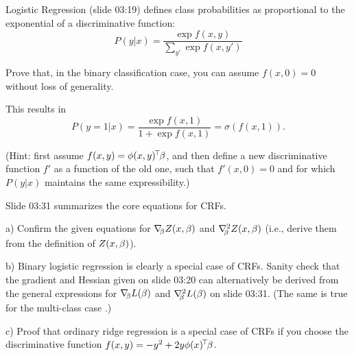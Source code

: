 



Logistic Regression (slide 03:19) defines class probabilities as proportional to
the exponential of a discriminative function:
$$P(y|x) = \frac{\exp f(x, y)}{\sum_{y'}\exp f(x, y')}$$

Prove that, in the binary classification case, you can assume $f(x, 0) = 0$
without loss of generality.  

This results in $$P(y=1|x) = \frac{\exp f(x, 1)}{1 + \exp f(x, 1)} =
\sigma(f(x, 1)).$$

(Hint: first assume $f(x, y) = \phi(x, y)^\T\beta$, and then define a new
discriminative function $f'$ as a function of the old one, such that $f'(x,
0)=0$ and for which $P(y|x)$ maintains the same expressibility.)



Slide 03:31 summarizes the core equations for CRFs.

a) Confirm the given equations for $\na_\b Z(x,\b)$ and $\he[\b]
Z(x,\b)$ (i.e., derive them from the definition of $Z(x,\b)$).

b) Binary logistic regression is clearly a special case of
CRFs. Sanity check that the gradient and Hessian given on slide 03:20
can alternatively be derived from the general expressions for $\na_\b L(\b)$ and
$\he[\b] L(\b)$ on slide 03:31. (The same is true for the multi-class case .)

c) Proof that ordinary ridge regression is a special case of CRFs if
you choose the discriminative function $f(x,y) = - y^2 + 2 y \phi(x)^\T \b$.

\exerfoot

